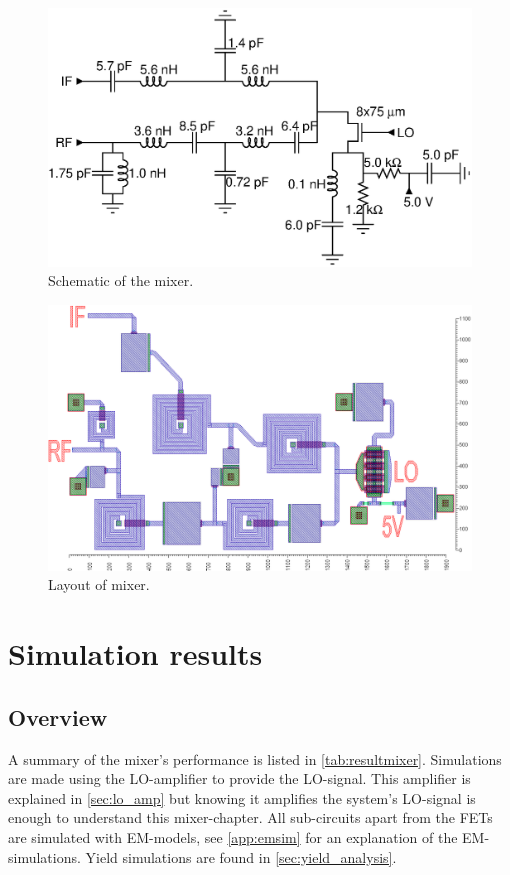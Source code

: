 		\begin{figure}[hbt!]
			\centering
			\includegraphics[width=1.0\textwidth]{fig/mixer/sch_mixer}
			\caption[Mixer schematic.]{Schematic of the mixer.}\label{fig:mixerschematic}
		\end{figure}

		\begin{figure}[hbt!]
			\centering
			\includegraphics[width=1.0\textwidth]{fig/mixer/layout}
			\caption[Mixer layout.]{Layout of mixer.\scalemum}\label{fig:mixerlayout}
		\end{figure}

	\section{Simulation results}\label{sec:mixer}
		\subsection{Overview}
			A summary of the mixer's performance is listed in \autoref{tab:resultmixer}. Simulations are made using the LO-amplifier to provide the LO-signal. This amplifier is explained in \autoref{sec:lo_amp} but knowing it amplifies the system's LO-signal is enough to understand this mixer-chapter. All sub-circuits apart from the FETs are simulated with EM-models, see \autoref{app:emsim} for an explanation of the EM-simulations. Yield simulations are found in \autoref{sec:yield_analysis}.

